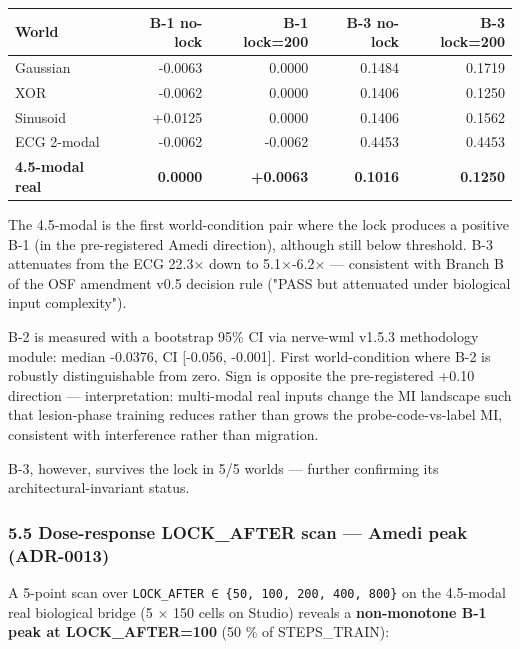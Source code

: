 \documentclass[
]{article}
\newcounter{none} %
\begin{document}
{\def\LTcaptype{none} %
\begin{longtable}[]{@{}lrrrr@{}}
\toprule\noalign{}
World & B-1 no-lock & B-1 lock=200 & B-3 no-lock & B-3 lock=200 \\
\midrule\noalign{}
\endhead
\bottomrule\noalign{}
\endlastfoot
Gaussian & -0.0063 & 0.0000 & 0.1484 & 0.1719 \\
XOR & -0.0062 & 0.0000 & 0.1406 & 0.1250 \\
Sinusoid & +0.0125 & 0.0000 & 0.1406 & 0.1562 \\
ECG 2-modal & -0.0062 & -0.0062 & 0.4453 & 0.4453 \\
\textbf{4.5-modal real} & \textbf{0.0000} & \textbf{+0.0063} &
\textbf{0.1016} & \textbf{0.1250} \\
\end{longtable}
}

The 4.5-modal is the first world-condition pair where the lock produces
a positive B-1 (in the pre-registered Amedi direction), although still
below threshold. B-3 attenuates from the ECG 22.3× down to 5.1×-6.2× ---
consistent with Branch B of the OSF amendment v0.5 decision rule ("PASS
but attenuated under biological input complexity").

B-2 is measured with a bootstrap 95\% CI via nerve-wml v1.5.3
methodology module: median -0.0376, CI {[}-0.056, -0.001{]}. First
world-condition where B-2 is robustly distinguishable from zero. Sign is
opposite the pre-registered +0.10 direction --- interpretation:
multi-modal real inputs change the MI landscape such that lesion-phase
training reduces rather than grows the probe-code-vs-label MI,
consistent with interference rather than migration.

B-3, however, survives the lock in 5/5 worlds --- further confirming its
architectural-invariant status.

\subsubsection{5.5 Dose-response LOCK\_AFTER scan --- Amedi peak
(ADR-0013)}\label{55-dose-response-lock_after-scan--amedi-peak-adr-0013}

A 5-point scan over
\texttt{LOCK\_AFTER\ ∈\ \{50,\ 100,\ 200,\ 400,\ 800\}} on the 4.5-modal
real biological bridge (5 × 150 cells on Studio) reveals a
\textbf{non-monotone B-1 peak at LOCK\_AFTER=100} (50 \% of
STEPS\_TRAIN):
\end{document}
